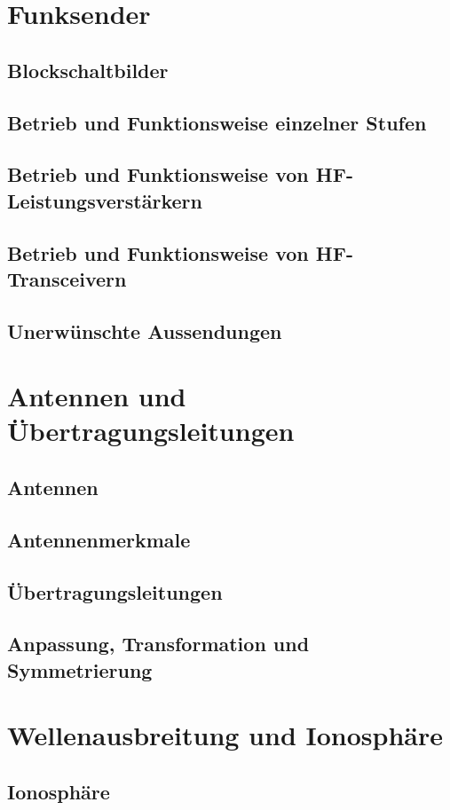 \documentclass[
  ngerman,
  paper=a4,
  10pt,
  headings=small,
  DIV=15,
]{scrartcl}
\begin{document}
  \section{Funksender}
  \subsection{Blockschaltbilder}
  \subsection{Betrieb und Funktionsweise einzelner Stufen}
  \subsection{Betrieb und Funktionsweise von HF-Leistungsverstärkern}
  \subsection{Betrieb und Funktionsweise von HF-Transceivern}
  \subsection{Unerwünschte Aussendungen}
  
  \section{Antennen und Übertragungsleitungen}
  \subsection{Antennen}
  \subsection{Antennenmerkmale}
  \subsection{Übertragungsleitungen}
  \subsection{Anpassung, Transformation und Symmetrierung}
  
  \section{Wellenausbreitung und Ionosphäre}
  \subsection{Ionosphäre}
\end{document}
